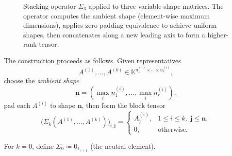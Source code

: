 \documentclass[11pt]{article}
\begin{document}
\begin{figure}[h]
\caption{Stacking operator $\Sigma_3$ applied to three variable-shape matrices. The operator computes the ambient shape (element-wise maximum dimensions), applies zero-padding equivalence to achieve uniform shapes, then concatenates along a new leading axis to form a higher-rank tensor.}
\label{fig:stacking}
\end{figure}

The construction proceeds as follows. Given representatives
\[
A^{(1)}, \ldots, A^{(k)} \in \mathbb{K}^{n_1^{(i)} \times \cdots \times n_r^{(i)}},
\]
choose the \emph{ambient shape}
\[
\mathbf{n} = \left(\max_i n_1^{(i)}, \ldots, \max_i n_r^{(i)}\right),
\]
pad each $A^{(i)}$ to shape $\mathbf{n}$, then form the block tensor
\[
\bigl(\Sigma_k(A^{(1)}, \ldots, A^{(k)})\bigr)_{i,\mathbf{j}} = 
\begin{cases}
A^{(i)}_{\mathbf{j}}, & 1 \leq i \leq k, \; \mathbf{j} \leq \mathbf{n}, \\
0, & \text{otherwise}.
\end{cases}
\]

For $k = 0$, define $\Sigma_0 \coloneqq 0_{\mathbb{T}_{r+1}}$ (the neutral element).
\end{document}
